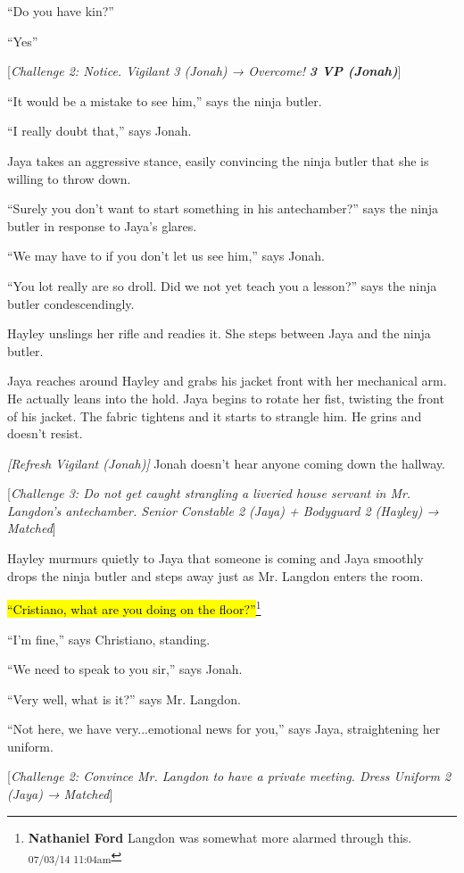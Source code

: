 ``Do you have kin?''

``Yes''

{[}\textit{Challenge 2: Notice. Vigilant 3 (Jonah) → Overcome! }\textit{\textbf{3 VP (Jonah)}}{]} 

``It would be a mistake to see him,'' says the ninja butler.

``I really doubt that,'' says Jonah.

Jaya takes an aggressive stance, easily convincing the ninja butler that she is willing to throw down.

``Surely you don't want to start something in his antechamber?'' says the ninja butler in response to Jaya's glares.

``We may have to if you don't let us see him,'' says Jonah.

``You lot really are so droll.  Did we not yet teach you a lesson?'' says the ninja butler condescendingly.

Hayley unslings her rifle and readies it.  She steps between Jaya and the ninja butler.

Jaya reaches around Hayley and grabs his jacket front with her mechanical arm.  He actually leans into the hold.  Jaya begins to rotate her fist, twisting the front of his jacket.  The fabric tightens and it starts to strangle him.  He grins and doesn't resist.

\textit{{[}Refresh Vigilant (Jonah){]}}  Jonah doesn't hear anyone coming down the hallway.

{[}\textit{Challenge 3: Do not get caught strangling a liveried house servant in Mr. Langdon's antechamber. Senior Constable 2 (Jaya) + Bodyguard 2 (Hayley) → Matched}{]} 

Hayley murmurs quietly to Jaya that someone is coming and Jaya smoothly drops the ninja butler and steps away just as Mr. Langdon enters the room.

\hl{``Cristiano, what are you doing on the floor?''}\footnote{\textbf{Nathaniel Ford }Langdon was somewhat more alarmed through this. \textsubscript{07/03/14 11:04am}}

``I'm fine,'' says Christiano, standing.

``We need to speak to you sir,'' says Jonah.

``Very well, what is it?'' says Mr. Langdon.

``Not here, we have very...emotional news for you,'' says Jaya, straightening her uniform.

{[}\textit{Challenge 2: Convince Mr. Langdon to have a private meeting. Dress Uniform 2 (Jaya) → Matched}{]} 

